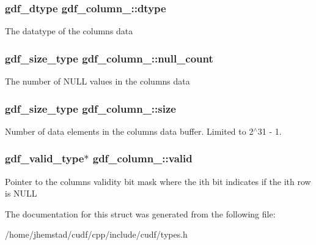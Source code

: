 \subsubsection[{\texorpdfstring{dtype}{dtype}}]{\setlength{\rightskip}{0pt plus 5cm}gdf\+\_\+dtype gdf\+\_\+column\+\_\+\+::dtype}\hypertarget{structgdf__column___a3e4d04127fb96d0c7debbe8d4e9d577f}{}\label{structgdf__column___a3e4d04127fb96d0c7debbe8d4e9d577f}
The datatype of the column\textquotesingle{}s data 
\subsubsection[{\texorpdfstring{null\+\_\+count}{null_count}}]{\setlength{\rightskip}{0pt plus 5cm}gdf\+\_\+size\+\_\+type gdf\+\_\+column\+\_\+\+::null\+\_\+count}\hypertarget{structgdf__column___a728baf018dbceb2b251332fd313478ec}{}\label{structgdf__column___a728baf018dbceb2b251332fd313478ec}
The number of N\+U\+LL values in the column\textquotesingle{}s data 
\subsubsection[{\texorpdfstring{size}{size}}]{\setlength{\rightskip}{0pt plus 5cm}gdf\+\_\+size\+\_\+type gdf\+\_\+column\+\_\+\+::size}\hypertarget{structgdf__column___a85c0e9161098e1bdf1c56f7657acf8dc}{}\label{structgdf__column___a85c0e9161098e1bdf1c56f7657acf8dc}
Number of data elements in the columns data buffer. Limited to 2$^\wedge$31 -\/ 1. 
\subsubsection[{\texorpdfstring{valid}{valid}}]{\setlength{\rightskip}{0pt plus 5cm}gdf\+\_\+valid\+\_\+type$\ast$ gdf\+\_\+column\+\_\+\+::valid}\hypertarget{structgdf__column___aab16b9467d41db5f36d2a708cba7d612}{}\label{structgdf__column___aab16b9467d41db5f36d2a708cba7d612}
Pointer to the columns validity bit mask where the \textquotesingle{}i\textquotesingle{}th bit indicates if the \textquotesingle{}i\textquotesingle{}th row is N\+U\+LL 

The documentation for this struct was generated from the following file\+:\begin{DoxyCompactItemize}
\item 
/home/jhemstad/cudf/cpp/include/cudf/types.\+h\end{DoxyCompactItemize}
